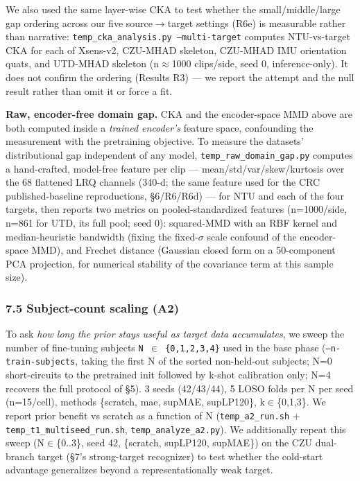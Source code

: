 We also used the same layer-wise CKA to test whether the small/middle/large gap ordering across our five source$\rightarrow$target settings (R6e) is measurable rather than narrative: \texttt{temp\_cka\_analysis.py --multi-target} computes NTU-vs-target CKA for each of Xsens-v2, CZU-MHAD skeleton, CZU-MHAD IMU orientation quats, and UTD-MHAD skeleton (n$\approx$1000 clips/side, seed 0, inference-only). It does not confirm the ordering (Results R3) --- we report the attempt and the null result rather than omit it or force a fit.

\textbf{Raw, encoder-free domain gap.} CKA and the encoder-space MMD above are both computed inside a \textit{trained encoder's} feature space, confounding the measurement with the pretraining objective. To measure the datasets' distributional gap independent of any model, \texttt{temp\_raw\_domain\_gap.py} computes a hand-crafted, model-free feature per clip --- mean/std/var/skew/kurtosis over the 68 flattened LRQ channels (340-d; the same feature used for the CRC published-baseline reproductions, \S{}6/R6/R6d) --- for NTU and each of the four targets, then reports two metrics on pooled-standardized features (n=1000/side, n=861 for UTD, its full pool; seed 0): squared-MMD with an RBF kernel and median-heuristic bandwidth (fixing the fixed-$\sigma$ scale confound of the encoder-space MMD), and Frechet distance (Gaussian closed form on a 50-component PCA projection, for numerical stability of the covariance term at this sample size).

\subsubsection{7.5 Subject-count scaling (A2)}
To ask \textit{how long the prior stays useful as target data accumulates}, we sweep the number of fine-tuning subjects \texttt{N $\in$ \{0,1,2,3,4\}} used in the base phase (\texttt{--n-train-subjects}, taking the first N of the sorted non-held-out subjects; N=0 short-circuits to the pretrained init followed by k-shot calibration only; N=4 recovers the full protocol of \S{}5). 3 seeds (42/43/44), 5 LOSO folds per N per seed (n=15/cell), methods \{scratch, mae, supMAE, supLP120\}, k$\in$\{0,1,3\}. We report prior benefit vs scratch as a function of N (\texttt{temp\_a2\_run.sh} + \texttt{temp\_t1\_multiseed\_run.sh}, \texttt{temp\_analyze\_a2.py}). We additionally repeat this sweep (N$\in$\{0..3\}, seed 42, \{scratch, supLP120, supMAE\}) on the CZU dual-branch target (\S{}7's strong-target recognizer) to test whether the cold-start advantage generalizes beyond a representationally weak target.

